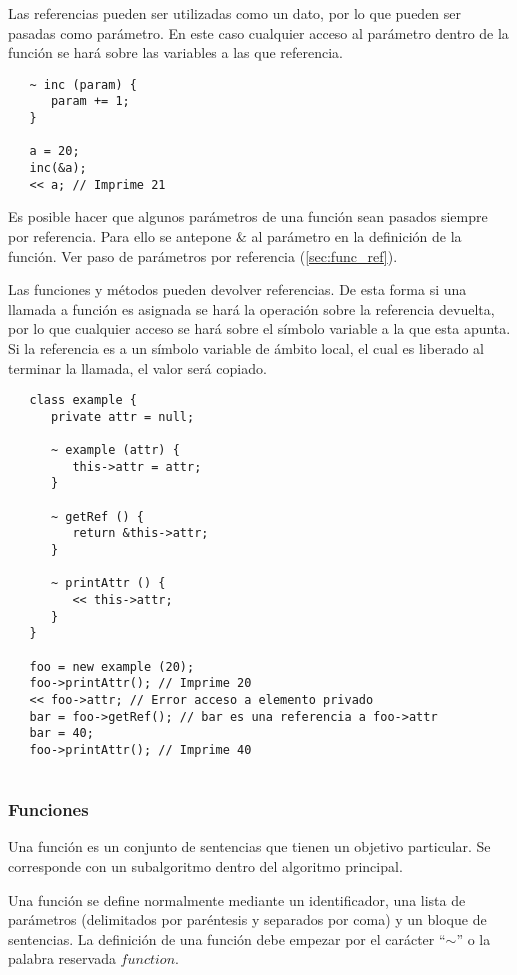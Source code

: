 Las referencias pueden ser utilizadas como un dato, por lo que pueden ser pasadas como parámetro. En este caso cualquier acceso al parámetro dentro de la función 
se hará sobre las variables a las que referencia. \\

\begin{lstlisting}
   ~ inc (param) {
      param += 1;
   }
   
   a = 20;
   inc(&a);
   << a; // Imprime 21
\end{lstlisting}

Es posible hacer que algunos parámetros de una función sean pasados siempre por referencia. Para ello se antepone $\&$ al parámetro en la definición de
la función. Ver paso de parámetros por referencia (\autoref{sec:func_ref}).

Las funciones y métodos pueden devolver referencias. De esta forma si una llamada a función es asignada se hará la operación sobre la referencia devuelta, 
por lo que cualquier acceso se hará sobre el símbolo variable a la que esta apunta. Si la referencia es a un símbolo variable de ámbito local, el cual es liberado al terminar la llamada, 
el valor será copiado. \\

\begin{lstlisting}
   class example {
      private attr = null;
      
      ~ example (attr) {
         this->attr = attr;
      }
      
      ~ getRef () {
         return &this->attr;
      }
      
      ~ printAttr () {
         << this->attr;
      }
   }
   
   foo = new example (20);
   foo->printAttr(); // Imprime 20
   << foo->attr; // Error acceso a elemento privado
   bar = foo->getRef(); // bar es una referencia a foo->attr
   bar = 40; 
   foo->printAttr(); // Imprime 40
   
\end{lstlisting}

\subsubsection{Funciones} \label{sec:function}
Una función es un conjunto de sentencias que tienen un objetivo particular. Se corresponde con un
subalgoritmo dentro del algoritmo principal.

Una función se define normalmente mediante un identificador, una lista de parámetros (delimitados por paréntesis y separados por coma) y un bloque de sentencias. La
definición de una función debe empezar por el carácter ``$\sim$'' o la palabra reservada $function$. \\


